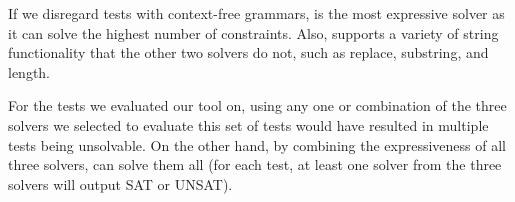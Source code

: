 If we disregard tests with context-free grammars,
\zstr is the most expressive solver as it can solve the highest number of constraints. Also, \zstr
supports a variety of string functionality that the other two solvers do not, such as replace, substring, and length.

For the \pickedtests tests we evaluated our tool on, using any one or combination of the three solvers we selected to evaluate this set of tests would have resulted
in multiple tests being unsolvable. On the other hand, by combining the
expressiveness of all three solvers, \imss can solve them all (for each test,
at least one solver from the three solvers will output SAT or UNSAT).
